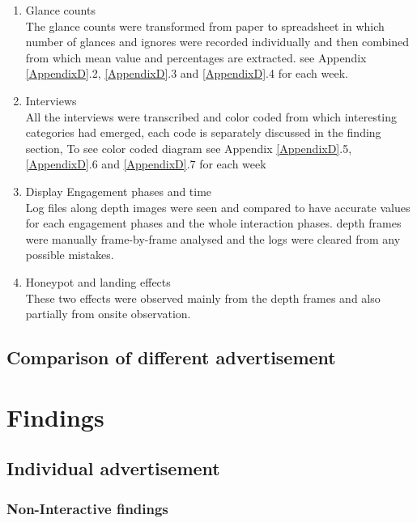 \begin{enumerate}

\item Glance counts \\
The glance counts were transformed from paper to spreadsheet in which number of glances and ignores were recorded individually and then combined from which mean value and percentages are extracted. see Appendix \ref{AppendixD}.2, \ref{AppendixD}.3 and \ref{AppendixD}.4 for each week.

\item Interviews \\
All the interviews were transcribed and color coded from which interesting categories had emerged, each code is separately discussed in the finding section, To see color coded diagram see Appendix \ref{AppendixD}.5, \ref{AppendixD}.6 and \ref{AppendixD}.7 for each week


\item Display Engagement phases and time \\
Log files along depth images were seen and compared to have accurate values for each engagement phases and the whole interaction phases. depth frames were manually frame-by-frame analysed and the logs were cleared from any possible mistakes.

\item Honeypot and landing effects \\
These two effects were observed mainly from the depth frames and also partially from onsite observation.


\end{enumerate}


\subsection{Comparison of different advertisement}



\section{Findings}



\subsection{Individual advertisement}


\subsubsection{Non-Interactive findings}




